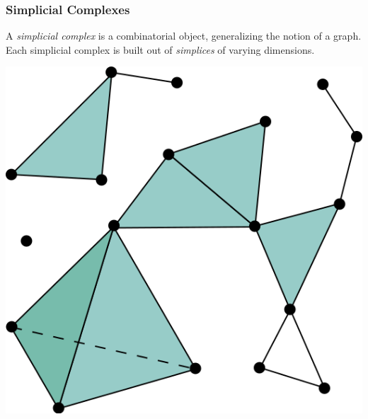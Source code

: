 \documentclass[usenames,dvipsnames,aspectratio=1610]{beamer}
\begin{document}

\begin{frame}
  \frametitle{Simplicial Complexes}
  A {\em simplicial complex} is a combinatorial object, generalizing the notion of a graph. Each
  simplicial complex is built out of {\em simplices} of varying dimensions.

  \begin{center}
    \includegraphics[scale=0.35]{images/Simplicial_complex_example.png}
  \end{center}
\end{frame}

\end{document}
